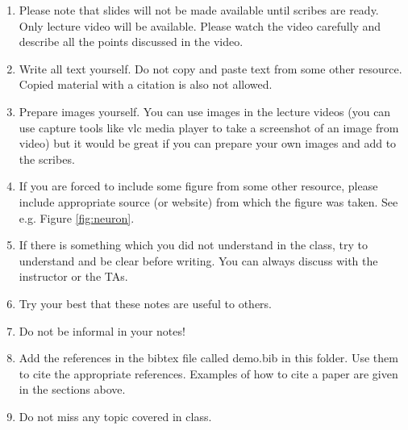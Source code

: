 \documentclass[twosided]{article}
\begin{document}
\begin{enumerate}
	\item Please note that slides will not be made available until scribes are ready. Only lecture video will be available. Please watch the video carefully and describe all the points discussed in the video. 
	\item Write all text yourself. Do not copy and paste text from some other resource. Copied material with a citation is also not allowed.  
	\item Prepare images yourself. You can use images in the lecture videos (you can use capture tools like vlc media player to take a screenshot of an image from video) but it would be great if you can prepare your own images and add to the scribes.  
	\item If you are forced to include some figure from some other resource, please include appropriate source (or website) from which the figure was taken. See e.g. Figure \ref{fig:neuron}.
 	\item  If there is something which you did not understand in the class, try to understand and be clear before writing. You can always discuss with the instructor or the TAs. 
	\item Try your best that these notes are useful to others.	
	\item Do not be informal in your notes!
	\item Add the references in the bibtex file called demo.bib in this folder. Use them to cite the appropriate references. Examples of how to cite a paper are given in the sections above.  
	\item Do not miss any topic covered in class. 
\end{enumerate}
	



\newpage

{} %
\end{document}
